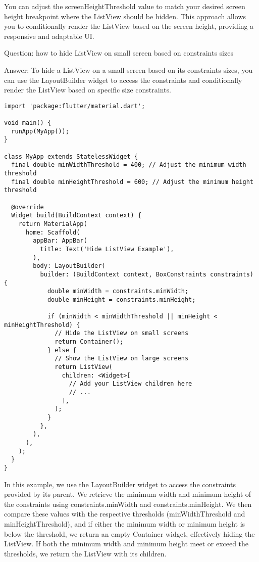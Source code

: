 You can adjust the screenHeightThreshold value to match your desired screen height breakpoint where the ListView 
should be hidden. This approach allows you to conditionally render the ListView based on the screen height, 
providing a responsive and adaptable UI.


Question: how to hide ListView on small screen based on constraints sizes

Answer: To hide a ListView on a small screen based on its constraints sizes, you can use the LayoutBuilder widget to 
access the constraints and conditionally render the ListView based on specific size constraints.

\begin{lstlisting}
import 'package:flutter/material.dart';

void main() {
  runApp(MyApp());
}

class MyApp extends StatelessWidget {
  final double minWidthThreshold = 400; // Adjust the minimum width threshold
  final double minHeightThreshold = 600; // Adjust the minimum height threshold

  @override
  Widget build(BuildContext context) {
    return MaterialApp(
      home: Scaffold(
        appBar: AppBar(
          title: Text('Hide ListView Example'),
        ),
        body: LayoutBuilder(
          builder: (BuildContext context, BoxConstraints constraints) {
            double minWidth = constraints.minWidth;
            double minHeight = constraints.minHeight;

            if (minWidth < minWidthThreshold || minHeight < minHeightThreshold) {
              // Hide the ListView on small screens
              return Container();
            } else {
              // Show the ListView on large screens
              return ListView(
                children: <Widget>[
                  // Add your ListView children here
                  // ...
                ],
              );
            }
          },
        ),
      ),
    );
  }
}
\end{lstlisting}

In this example, we use the LayoutBuilder widget to access the constraints provided by its parent. We retrieve the 
minimum width and minimum height of the constraints using constraints.minWidth and constraints.minHeight. We then 
compare these values with the respective thresholds (minWidthThreshold and minHeightThreshold), and if either the 
minimum width or minimum height is below the threshold, we return an empty Container widget, effectively hiding 
the ListView. If both the minimum width and minimum height meet or exceed the thresholds, we return the ListView 
with its children.

